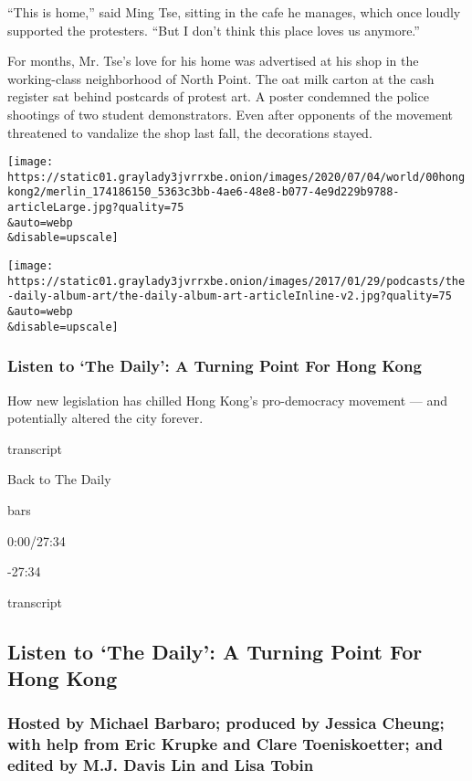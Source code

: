 ``This is home,'' said Ming Tse, sitting in the cafe he manages, which
once loudly supported the protesters. ``But I don't think this place
loves us anymore.''

For months, Mr. Tse's love for his home was advertised at his shop in
the working-class neighborhood of North Point. The oat milk carton at
the cash register sat behind postcards of protest art. A poster
condemned the police shootings of two student demonstrators. Even after
opponents of the movement threatened to vandalize the shop last fall,
the decorations stayed.

\texttt{[image: https://static01.graylady3jvrrxbe.onion/images/2020/07/04/world/00hongkong2/merlin\_174186150\_5363c3bb-4ae6-48e8-b077-4e9d229b9788-articleLarge.jpg?quality=75\\\&auto=webp\\\&disable=upscale]}

\texttt{[image: https://static01.graylady3jvrrxbe.onion/images/2017/01/29/podcasts/the-daily-album-art/the-daily-album-art-articleInline-v2.jpg?quality=75\\\&auto=webp\\\&disable=upscale]}

\hypertarget{listen-to-the-daily-a-turning-point-for-hong-kong}{%
\subsubsection{Listen to `The Daily': A Turning Point For Hong
Kong}\label{listen-to-the-daily-a-turning-point-for-hong-kong}}

How new legislation has chilled Hong Kong's pro-democracy movement ---
and potentially altered the city forever.

transcript

Back to The Daily

bars

0:00/27:34

-27:34

transcript

\hypertarget{listen-to-the-daily-a-turning-point-for-hong-kong-1}{%
\subsection{Listen to `The Daily': A Turning Point For Hong
Kong}\label{listen-to-the-daily-a-turning-point-for-hong-kong-1}}

\hypertarget{hosted-by-michael-barbaro-produced-by-jessica-cheung-with-help-from-eric-krupke-and-clare-toeniskoetter-and-edited-by-mj-davis-lin-and-lisa-tobin}{%
\subsubsection{Hosted by Michael Barbaro; produced by Jessica Cheung;
with help from Eric Krupke and Clare Toeniskoetter; and edited by M.J.
Davis Lin and Lisa
Tobin}\label{hosted-by-michael-barbaro-produced-by-jessica-cheung-with-help-from-eric-krupke-and-clare-toeniskoetter-and-edited-by-mj-davis-lin-and-lisa-tobin}}

